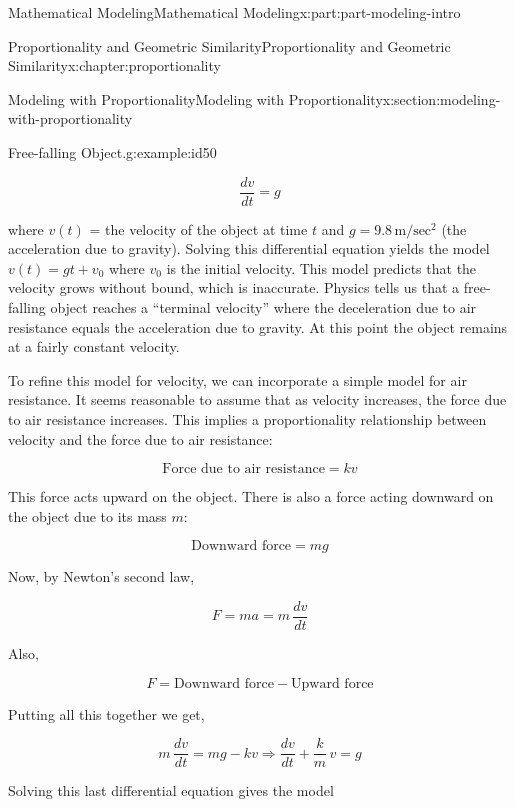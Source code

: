 \documentclass[oneside,10pt,]{book}
\numberwithin{equation}{section}
\begin{document}
\begin{partptx}{Mathematical Modeling}{}{Mathematical Modeling}{}{}{x:part:part-modeling-intro}
\begin{chapterptx}{Proportionality and Geometric Similarity}{}{Proportionality and Geometric Similarity}{}{}{x:chapter:proportionality}
\begin{sectionptx}{Modeling with Proportionality}{}{Modeling with Proportionality}{}{}{x:section:modeling-with-proportionality}
\begin{example}{Free-falling Object.}{g:example:id50}
\par
%
\begin{equation*}
\frac{dv}{dt} = g 
\end{equation*}
%
\par
where \(v(t)\) = the velocity of the object at time \(t\) and \(g = 9.8\,\text{m}/\text{sec}^2\) (the acceleration due to gravity). Solving this differential equation yields the model \(v(t) = gt + v_0\) where \(v_0\) is the initial velocity. This model predicts that the velocity grows without bound, which is inaccurate. Physics tells us that a free-falling object reaches a ``terminal velocity'' where the deceleration due to air resistance equals the acceleration due to gravity. At this point the object remains at a fairly constant velocity.%
\par
To refine this model for velocity, we can incorporate a simple model for air resistance. It seems reasonable to assume that as velocity increases, the force due to air resistance increases. This implies a proportionality relationship between velocity and the force due to air resistance:%
\par
%
\begin{equation*}
\text{Force due to air resistance} = kv
\end{equation*}
%
\par
This force acts upward on the object. There is also a force acting downward on the object due to its mass \(m\):%
\par
%
\begin{equation*}
\text{Downward force} = mg
\end{equation*}
%
\par
Now, by Newton's second law,%
\par
%
\begin{equation*}
F = ma = m\,\frac{dv}{dt}
\end{equation*}
%
\par
Also,%
\par
%
\begin{equation*}
F = \text{Downward force} - \text{Upward force}
\end{equation*}
%
\par
Putting all this together we get,%
\par
%
\begin{equation*}
m\,\frac{dv}{dt} = mg - kv \Longrightarrow \frac{dv}{dt} + \frac{k}{m}\,v = g
\end{equation*}
%
\par
Solving this last differential equation gives the model%

\end{example}
\end{sectionptx}
\end{chapterptx}
\end{partptx}
\end{document}
